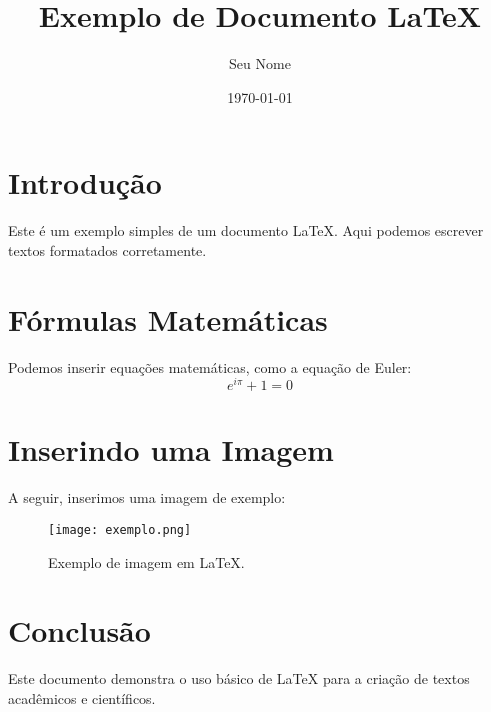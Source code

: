 \documentclass{article}
\title{Exemplo de Documento LaTeX}
\author{Seu Nome}
\date{\today}
\begin{document}
\maketitle

\section{Introdução}
Este é um exemplo simples de um documento LaTeX. Aqui podemos escrever textos formatados corretamente.

\section{Fórmulas Matemáticas}
Podemos inserir equações matemáticas, como a equação de Euler:
\begin{equation}
    e^{i\pi} + 1 = 0
\end{equation}

\section{Inserindo uma Imagem}
A seguir, inserimos uma imagem de exemplo:
\begin{figure}[h]
    \centering
    \texttt{[image: exemplo.png]}
    \caption{Exemplo de imagem em LaTeX.}
    \label{fig:exemplo}
\end{figure}

\section{Conclusão}
Este documento demonstra o uso básico de LaTeX para a criação de textos acadêmicos e científicos.
\end{document}
